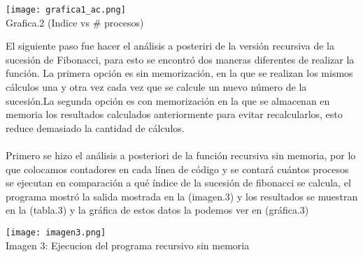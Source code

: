 \documentclass[12pt,twoside]{article}
\begin{document}
\begin{center}
  \begin{minipage}{\linewidth}
    \centering
    \texttt{[image: grafica1\_ac.png]}
    \\
    Grafica.2 (Indice vs \# procesos)
\end{minipage}
\end{center}

El siguiente paso fue hacer el análisis a posteriri de la versión recursiva de la sucesión de Fibonacci, para esto se encontró dos maneras diferentes de realizar la función. La primera opción es sin memorización, en la que se realizan los mismos cálculos una y otra vez cada vez que se calcule un nuevo número de la sucesión.La segunda opción es con memorización en la que se almacenan en memoria los resultados  calculados anteriormente para evitar recalcularlos, esto reduce demasiado la cantidad de cálculos.
\\\\
Primero se hizo el análisis a posteriori de la función recursiva sin memoria, por lo que colocamos contadores en cada línea de código y se contará cuántos procesos se ejecutan en comparación a qué índice de la sucesión de fibonacci se calcula, el programa mostró la salida mostrada en la (imagen.3) y  los resultados se muestran en la (tabla.3) y la gráfica de estos datos la podemos ver en (gráfica.3)

\begin{center}
  \begin{minipage}{\linewidth}
    \centering
    \texttt{[image: imagen3.png]}
    \\
    Imagen 3: Ejecucion del programa recursivo sin memoria
\end{minipage}
\end{center}
\medskip
\end{document}

